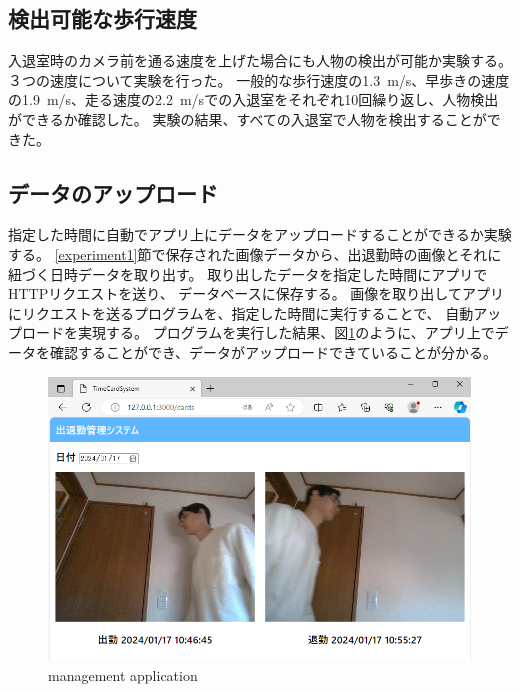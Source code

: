 \documentclass[10pt]{jarticle}
\begin{document}
    \subsection{検出可能な歩行速度}
    入退室時のカメラ前を通る速度を上げた場合にも人物の検出が可能か実験する。
    ３つの速度について実験を行った。
    一般的な歩行速度の1.3~m/s、早歩きの速度の1.9~m/s、走る速度の2.2~m/sでの入退室をそれぞれ10回繰り返し、人物検出ができるか確認した。 
    実験の結果、すべての入退室で人物を検出することができた。


    \subsection{データのアップロード}

指定した時間に自動でアプリ上にデータをアップロードすることができるか実験する。
\ref{experiment1}節で保存された画像データから、出退勤時の画像とそれに紐づく日時データを取り出す。
取り出したデータを指定した時間にアプリでHTTPリクエストを送り、
データベースに保存する。
画像を取り出してアプリにリクエストを送るプログラムを、指定した時間に実行することで、
自動アップロードを実現する。
プログラムを実行した結果、図\ref{application}のように、アプリ上でデータを確認することができ、データがアップロードできていることが分かる。
\begin{figure}[!h]
    \centering
    \includegraphics[width=1.0\linewidth]{fig/application3.png}
    \caption{management application}
    \label{application}
    \end{figure}
\end{document}
